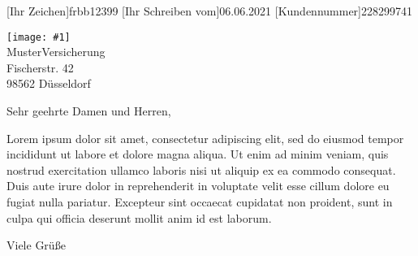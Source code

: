 \documentclass[
	version=last,
	fontsize=12pt,
	parskip=full,
	paper=A4,	
]{scrlttr2}
\newcommand{\includepostage}[1]{
	\centering
		\texttt{[image: \#1]}
}
\begin{document}


[Ihr Zeichen]{frbb12399}
[Ihr Schreiben vom]{06.06.2021}
[Kundennummer]{228299741}






\begin{letter}{
\includepostage{path/Internetmarke}\\ %
	MusterVersicherung\\
	Fischerstr. 42\\
	98562 Düsseldorf\\
}

\opening{Sehr geehrte Damen und Herren,}

Lorem ipsum dolor sit amet, consectetur adipiscing elit, sed do eiusmod tempor incididunt ut labore et dolore magna aliqua. Ut enim ad minim veniam, quis nostrud exercitation ullamco laboris nisi ut aliquip ex ea commodo consequat. Duis aute irure dolor in reprehenderit in voluptate velit esse cillum dolore eu fugiat nulla pariatur. Excepteur sint occaecat cupidatat non proident, sunt in culpa qui officia deserunt mollit anim id est laborum.

\closing{Viele Grüße}


\end{letter}
\end{document}
